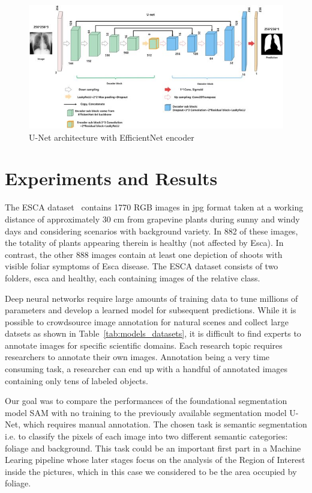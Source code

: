 \documentclass[runningheads]{llncs}
\begin{document}
\begin{figure}[h!]
\centering
   \includegraphics[width=\linewidth]{imgs/U-Net-with-EfficientNet-b4-Encoder_W640.jpg}
\caption{U-Net architecture with EfficientNet encoder~\cite{liu_automatic_2022}}
\label{fig:efficientnet}
\end{figure}

\section{Experiments and Results}

The ESCA dataset~\cite{ESCA_dataset} contains 1770 RGB images in jpg format taken at a working distance of approximately 30 cm from grapevine plants during sunny and windy days and considering scenarios with background variety. In 882 of these images, the totality of plants appearing therein is healthy (not affected by Esca). In contrast, the other 888 images contain at least one depiction of shoots with visible foliar symptoms of Esca disease. The ESCA dataset consists of two folders, esca and healthy, each containing images of the relative class.

Deep neural networks require large amounts of training data to tune millions of parameters and develop a learned model for subsequent predictions. While it is possible to crowdsource image annotation for natural scenes and collect large datsets as shown in Table~\ref{tab:models_datasets}, it is difficult to find experts to annotate images for specific scientific domains. Each research topic requires researchers to annotate their own images. Annotation being a very time consuming task, a researcher can end up with a handful of annotated images containing only tens of labeled objects. 

Our goal was to compare the performances of the foundational segmentation model SAM with no training to the previously available segmentation model U-Net, which requires manual annotation. The chosen task is semantic segmentation i.e. to classify the pixels of each image into two different semantic categories: foliage and background. This task could be an important first part in a Machine Learing pipeline whose later stages focus on the analysis of the Region of Interest inside the pictures, which in this case we considered to be the area occupied by foliage.
\end{document}
